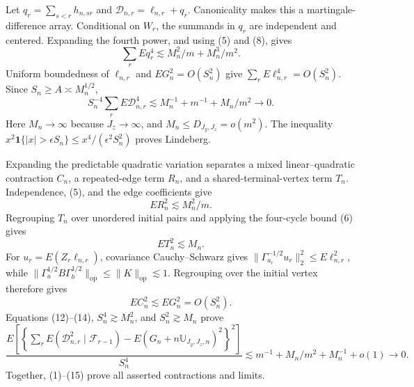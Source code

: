 Let \(q_r=\sum_{s<r}h_{n,sr}\) and \(\mathcal D_{n,r}=\ell_{n,r}+q_r\).  Canonicality makes this a martingale-difference array.  Conditional on \(W_r\), the summands in \(q_r\) are independent and centered.  Expanding the fourth power, and using (5) and (8), gives
\[
\sum_rEq_r^4\lesssim M_n^2/m+M_n^3/m^2. \tag{10}
\]
Uniform boundedness of \(\ell_{n,r}\) and \(EG_n^2=O(S_n^2)\) give \(\sum_rE\ell_{n,r}^4=O(S_n^2)\).  Since \(S_n\ge A\asymp M_n^{1/2}\),
\[
S_n^{-4}\sum_rE\mathcal D_{n,r}^4
\lesssim M_n^{-1}+m^{-1}+M_n/m^2\to0. \tag{11}
\]
Here \(M_n\to\infty\) because \(J_z\to\infty\), and \(M_n\le D_{J_y,J_z}=o(m^2)\).  The inequality \(x^2\mathbf1\{|x|>\epsilon S_n\}\le x^4/(\epsilon^2S_n^2)\) proves Lindeberg.

Expanding the predictable quadratic variation separates a mixed linear--quadratic contraction \(C_n\), a repeated-edge term \(R_n\), and a shared-terminal-vertex term \(T_n\).  Independence, (5), and the edge coefficients give
\[
ER_n^2\lesssim M_n^2/m. \tag{12}
\]
Regrouping \(T_n\) over unordered initial pairs and applying the four-cycle bound (6) gives
\[
ET_n^2\lesssim M_n. \tag{13}
\]
For \(u_r=E(Z_r\ell_{n,r})\), covariance Cauchy--Schwarz gives \(\|\Gamma_{a_r}^{-1/2}u_r\|_2^2\le E\ell_{n,r}^2\), while \(\|\Gamma_a^{1/2}B\Gamma_b^{1/2}\|_{\mathrm{op}}\le\|K\|_{\mathrm{op}}\lesssim1\).  Regrouping over the initial vertex therefore gives
\[
EC_n^2\lesssim EG_n^2=O(S_n^2). \tag{14}
\]
Equations (12)--(14), \(S_n^4\gtrsim M_n^2\), and \(S_n^2\gtrsim M_n\) prove
\[
\frac{E\left[\left\{\sum_rE(\mathcal D_{n,r}^2\mid\mathcal F_{r-1})
-E(G_n+n\mathbb U_{J_y,J_z,n})^2\right\}^2\right]}{S_n^4}
\lesssim m^{-1}+M_n/m^2+M_n^{-1}+o(1)\to0. \tag{15}
\]
Together, (1)--(15) prove all asserted contractions and limits.